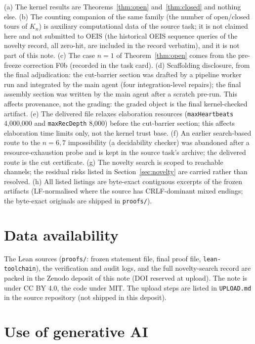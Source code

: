 \documentclass[11pt]{article}
\begin{document}
(a) The kernel results are Theorems~\ref{thm:open} and~\ref{thm:closed} and
nothing else. (b) The counting companion of the same family (the number of
open/closed tours of $K_n$) is auxiliary computational data of the source
task; it is not claimed here and not submitted to OEIS (the historical
OEIS sequence queries of the novelty record, all zero-hit, are included in
the record verbatim), and it is not part of this note. (c) The case $n=1$ of Theorem~\ref{thm:open} comes from the
pre-freeze correction F0b (recorded in the task card). (d) Scaffolding
disclosure, from the final adjudication: the cut-barrier section was
drafted by a pipeline worker run and integrated by the main agent (four
integration-level repairs); the final assembly section was written by the
main agent after a scratch pre-run. This affects provenance, not the
grading: the graded object is the final kernel-checked artifact. (e) The
delivered file relaxes elaboration resources
(\texttt{maxHeartbeats} 4{,}000{,}000 and \texttt{maxRecDepth} 8{,}000)
before the cut-barrier section; this affects elaboration time limits only,
not the kernel trust base. (f) An earlier search-based route to the
$n=6,7$ impossibility (a decidability checker) was abandoned after a
resource-exhaustion probe and is kept in the source task's archive; the
delivered route is the cut certificate. (g) The novelty search is scoped
to reachable channels; the residual risks listed in
Section~\ref{sec:novelty} are carried rather than resolved. (h) All listed
listings are byte-exact contiguous excerpts of the frozen artifacts
(LF-normalised where the source has CRLF-dominant mixed endings; the
byte-exact originals are shipped in \texttt{proofs/}).

\section*{Data availability}

The Lean sources (\texttt{proofs/}: frozen statement file, final proof
file, \texttt{lean-toolchain}), the verification and audit logs, and the
full novelty-search record are packed in the Zenodo deposit of this note
(DOI reserved at upload). The note is under CC BY 4.0, the code under MIT.
The upload steps are listed in \texttt{UPLOAD.md} in the source repository
(not shipped in this deposit).

\section*{Use of generative AI}
\end{document}
